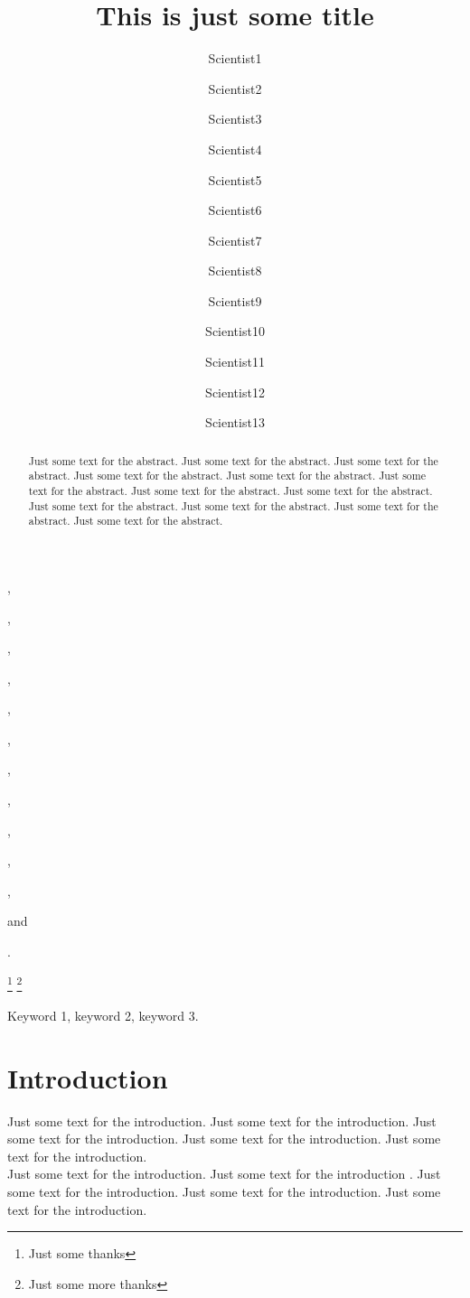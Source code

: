 \documentclass[a4paper,11pt,twocolumn,pdftex]{nveart}
\begin{document}

\begin{frontmatter}
\title{This is just some title}

\author[Inst1]{Scientist1},
\author[Inst3]{Scientist2},
\author[Inst2]{Scientist3},
\author[Inst2]{Scientist4},
\author[Inst1]{Scientist5},
\author[Inst2]{Scientist6},
\author[Inst1]{Scientist7},
\author[Inst2]{Scientist8},
\author[Inst3]{Scientist9},
\author[Inst2]{Scientist10},
\author[Inst2]{Scientist11},
\author[Inst3]{Scientist12} and
\author[Inst1]{Scientist13}.


\address[Inst1]{Some department, Institute 1\\
              Address of institue 1}
\address[Inst2]{Some department, Institute 2\\
              Address of institue 2}
\address[Inst3]{Some department, Institute 3\\
              Address of institue 3}
\thanks[someone1]{Just some thanks}
\thanks[someone2]{Just some more thanks}


\begin{abstract}
Just some text for the abstract. Just some text for the abstract. Just some text for the abstract.
Just some text for the abstract. Just some text for the abstract. Just some text for the abstract.
Just some text for the abstract. Just some text for the abstract.
Just some text for the abstract. Just some text for the abstract. Just some text for the abstract.
Just some text for the abstract.
\end{abstract}

\begin{keyword}
Keyword 1,
keyword 2,
keyword 3.
\end{keyword}
\end{frontmatter}

\section{Introduction}
Just some text for the introduction. Just some text for the introduction. Just some text for the introduction.
Just some text for the introduction. Just some text for the introduction.\\
Just some text for the introduction. Just some text for the introduction \cite{shock}. Just some text for the introduction.
Just some text for the introduction. Just some text for the introduction.
\end{document}
